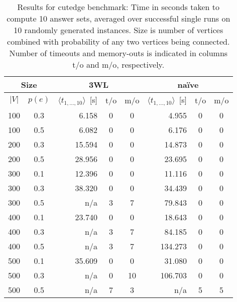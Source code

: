 \documentclass[final]{vutinfth} %
\begin{document}
\begin{table}
\begin{center}
	\begin{tabular}{|cc||rcc|rcc|}
\hline
\multicolumn{2}{|c||}{Size} & \multicolumn{3}{c|}{3WL} & \multicolumn{3}{c|}{na\"{i}ve} \\
\hline
$|V|$ & $p(e)$& $\langle t_{1, \ldots, 10} \rangle$~[s]&t/o&m/o& $\langle t_{1, \ldots, 10} \rangle$~[s]&t/o&m/o\\
\hline
\hline
100 & 0.3 & 	  6.158 & 0 &  0 &	  4.955 & 0 & 0 \\
100 & 0.5 & 	  6.082 & 0 &  0 &	  6.176 & 0 & 0 \\
200 & 0.3 & 	 15.594 & 0 &  0 &	 14.873 & 0 & 0 \\
200 & 0.5 & 	 28.956 & 0 &  0 &	 23.695 & 0 & 0 \\
300 & 0.1 & 	 12.396 & 0 &  0 &	 11.116 & 0 & 0 \\
300 & 0.3 & 	 38.320 & 0 &  0 &	 34.439 & 0 & 0 \\
300 & 0.5 & 	    n/a & 3 &  7 &	 79.843 & 0 & 0 \\
400 & 0.1 & 	 23.740 & 0 &  0 &	 18.643 & 0 & 0 \\
400 & 0.3 & 	    n/a & 3 &  7 &	 84.185 & 0 & 0 \\
400 & 0.5 & 	    n/a & 3 &  7 &	134.273 & 0 & 0 \\
500 & 0.1 & 	 35.609 & 0 &  0 &	 31.080 & 0 & 0 \\
500 & 0.3 & 	    n/a & 0 & 10 &	106.703 & 0 & 0 \\
500 & 0.5 & 	    n/a & 7 &  3 &	    n/a & 5 & 5 \\
\hline
	\end{tabular}
	\end{center}
	
	\caption[Results for cutedge benchmark]{Results for cutedge benchmark: Time in seconds taken to compute 10 answer sets, averaged over successful single runs on 10 randomly generated instances. Size is number of vertices combined with probability of any two vertices being connected. Number of timeouts and memory-outs is indicated in columns t/o and m/o, respectively.}
	\label{tbl:cut}
\end{table}
\end{document}
